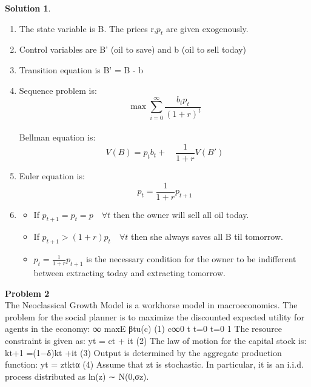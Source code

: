 \documentclass[letterpaper,12pt]{article}
\theoremstyle{definition}
\newtheorem{solution}[theorem]{Solution}
\begin{document}
\begin{solution} ~\\
  \begin{enumerate}
  \item The state variable is B. The prices r,$p_t$ are given exogenously.
  \item Control variables are B' (oil to save) and b (oil to sell today)
  \item Transition equation is B' = B - b
  \item Sequence problem is: \[ \max \sum_{i=0}^\infty \frac{b_tp_t}{(1+r)^t} \] \\
  Bellman equation is:
  \[ V(B) = p_tb_t + \quad \frac{1}{1+r} V(B')\]
  \item Euler equation is: \[ p_t = \frac{1}{1+r}p_{t+1}
  \]
  \item
  \begin{itemize}
    \item If $p_{t+1}=p_t=p \quad \forall t$ then the owner will sell all oil today.
    \item If $p_{t+1} > (1+r) p_t \quad \forall t$ then she always saves all B til tomorrow.
    \item $p_t = \frac{1}{1+r}p_{t+1}$ is the necessary condition for the owner to be indifferent between extracting today and extracting tomorrow.
  \end{itemize}
  \end{enumerate}
\end{solution}

\noindent\textbf{Problem 2} ~\\
The Neoclassical Growth Model is a workhorse model in macroeconomics. The problem for the social planner is to maximize the discounted expected utility for agents in the economy:
∞
 maxE  βtu(c) (1) {c}∞0 t
t=0 t=0 1
The resource constraint is given as:
yt = ct + it (2) The law of motion for the capital stock is:
kt+1 =(1−δ)kt +it (3) Output is determined by the aggregate production function:
yt = ztktα (4) Assume that zt is stochastic. In particular, it is an i.i.d. process distributed as ln(z) ∼
N(0,σz).
\end{document}
